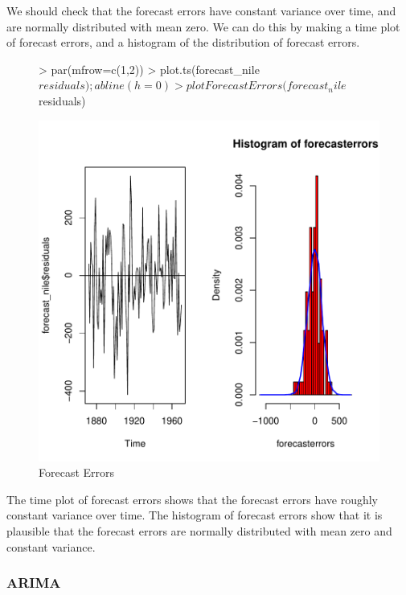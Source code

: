 \documentclass[11pt, a4paper]{article} %
\begin{document}
\noindent We should check that the forecast errors have constant variance over time, and are normally distributed with mean zero. We can do this by making a time plot of forecast errors, and a histogram of the distribution of forecast errors.



\begin{figure}
\centering
\begin{Schunk}
\begin{Sinput}
> par(mfrow=c(1,2))
> plot.ts(forecast_nile$residuals);abline(h=0)
> plotForecastErrors(forecast_nile$residuals)
\end{Sinput}
\end{Schunk}
\includegraphics{alles-043}
\caption{Forecast Errors}
\end{figure}

\noindent The time plot of forecast errors shows that the forecast errors have roughly constant variance over time. The histogram of forecast errors show that it is plausible that the forecast errors are normally distributed with mean zero and constant variance.

\subsubsection{ARIMA}
\end{document}
